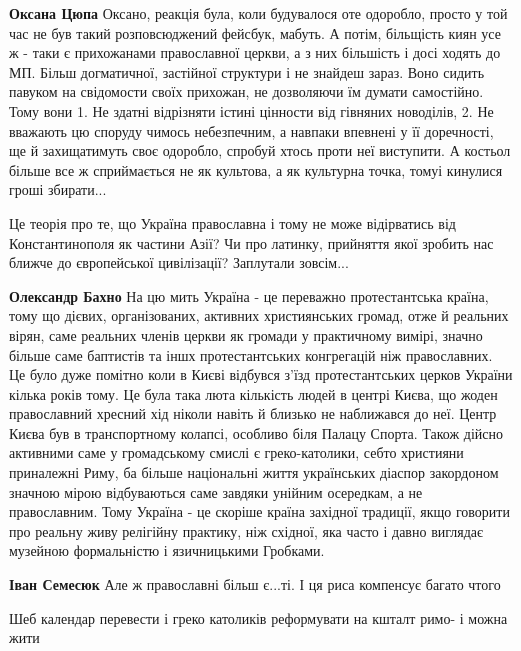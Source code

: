 \begin{itemize}
\begin{itemize}
\textbf{Оксана Цюпа} Оксано, реакція була, коли будувалося оте одоробло, просто у той час не був такий розповсюджений фейсбук, мабуть. А потім, більщість киян усе ж - таки є прихожанами православної церкви, а з них більшість і досі ходять до МП. Більш догматичної, застійної структури і не знайдеш зараз. Воно сидить павуком на свідомости своїх прихожан, не дозволяючи їм думати самостійно. Тому вони 1. Не здатні відрізняти істині цінности від гівняних новоділів, 2. Не вважають цю споруду чимось небезпечним, а навпаки впевнені у її доречності, ще й захищатимуть своє одоробло, спробуй хтось проти неї виступити. А костьол більше все ж сприймається не як культова, а як культурна точка, томуі кинулися гроші збирати...

\end{itemize} %


Це теорія про те, що Україна православна і тому не може відірватись від
Константинополя як частини Азії? Чи про латинку, прийняття якої зробить нас
ближче до європейської цивілізації? Заплутали зовсім...

\begin{itemize} %
\textbf{Олександр Бахно} На цю мить Україна - це переважно протестантська
країна, тому що дієвих, організованих, активних християнських громад, отже й
реальних вірян, саме реальних членів церкви як громади у практичному вимірі,
значно більше саме баптистів та іншх протестантських конгрегацій ніж
православних. Це було дуже помітно коли в Києві відбувся з'їзд протестантських
церков України кілька років тому. Це була така люта кількість людей в центрі
Києва, що жоден православний хресний хід ніколи навіть й близько не наближався
до неї. Центр Києва був в транспортному колапсі, особливо біля Палацу Спорта.
Також дійсно активними саме у громадському смислі є греко-католики, себто
християни приналежні Риму, ба більше національні життя українських діаспор
закордоном значною мірою відбуваються саме завдяки унійним осередкам, а не
православним. Тому Україна - це скоріше країна західної традиції, якщо говорити
про реальну живу релігійну практику, ніж східної, яка часто і давно виглядає
музейною формальністю і язичницькими Гробками.

\textbf{Іван Семесюк} Але ж православні більш є...ті. І ця риса компенсує багато чтого

Шеб календар перевести і греко католиків реформувати на кшталт римо- і можна жити
\end{itemize} %


\end{itemize}
